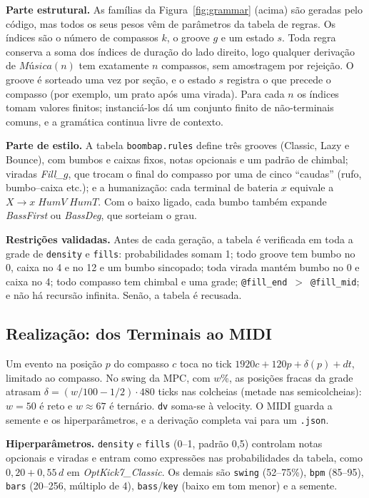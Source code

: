 \documentclass{article}
\newcommand{\nt}[1]{\textit{#1}}
\newcommand{\tm}[1]{\texttt{#1}}
\begin{document}
\textbf{Parte estrutural.} As famílias da Figura~\ref{fig:grammar} (acima) são geradas pelo código,
mas todos os seus pesos vêm de parâmetros da tabela de regras. Os índices são o número de compassos
$k$, o groove $g$ e um estado $s$. Toda regra conserva a soma dos índices de duração do lado direito,
logo qualquer derivação de $\nt{Música}(n)$ tem exatamente $n$ compassos, sem amostragem por
rejeição. O groove é sorteado uma vez por seção, e o estado $s$ registra o que precede o compasso (por
exemplo, um prato após uma virada). Para cada $n$ os índices tomam valores finitos; instanciá-los dá
um conjunto finito de não-terminais comuns, e a gramática continua livre de contexto.

\textbf{Parte de estilo.} A tabela \tm{boombap.rules} define três grooves (Classic, Lazy e Bounce),
com bumbos e caixas fixos, notas opcionais e um padrão de chimbal; viradas \nt{Fill\_}$g$, que trocam
o final do compasso por uma de cinco ``caudas'' (rufo, bumbo--caixa etc.); e a humanização: cada
terminal de bateria $x$ equivale a $X\to x\;\nt{HumV}\;\nt{HumT}$. Com o baixo ligado, cada bumbo
também expande \nt{BassFirst} ou \nt{BassDeg}, que sorteiam o grau.

\textbf{Restrições validadas.} Antes de cada geração, a tabela é verificada em toda a grade de
\tm{density} e \tm{fills}: probabilidades somam 1; todo groove tem bumbo no 0, caixa no 4 e no 12 e um
bumbo sincopado; toda virada mantém bumbo no 0 e caixa no 4; todo compasso tem chimbal e uma grade;
\tm{@fill\_end}~$>$~\tm{@fill\_mid}; e não há recursão infinita. Senão, a tabela é recusada.

\subsection{Realização: dos Terminais ao MIDI}

Um evento na posição $p$ do compasso $c$ toca no tick $1920c+120p+\delta(p)+\textit{dt}$, limitado ao
compasso. No swing da MPC,
com $w$\%, as posições fracas da grade atrasam $\delta=(w/100-1/2)\cdot 480$ ticks nas colcheias (metade
nas semicolcheias): $w=50$ é reto e $w\approx 67$ é ternário. \tm{dv} soma-se à velocity. O MIDI
guarda a semente e os hiperparâmetros, e a derivação completa vai para um \tm{.json}.

\textbf{Hiperparâmetros.} \tm{density} e \tm{fills} (0--1, padrão 0,5) controlam notas opcionais e
viradas e entram como expressões nas probabilidades da tabela, como $0{,}20+0{,}55\,d$ em
\nt{OptKick7\_Classic}. Os demais são \tm{swing} (52--75\%), \tm{bpm} (85--95), \tm{bars} (20--256, múltiplo de 4),
\tm{bass}/\tm{key} (baixo em tom menor) e a semente.
\end{document}
